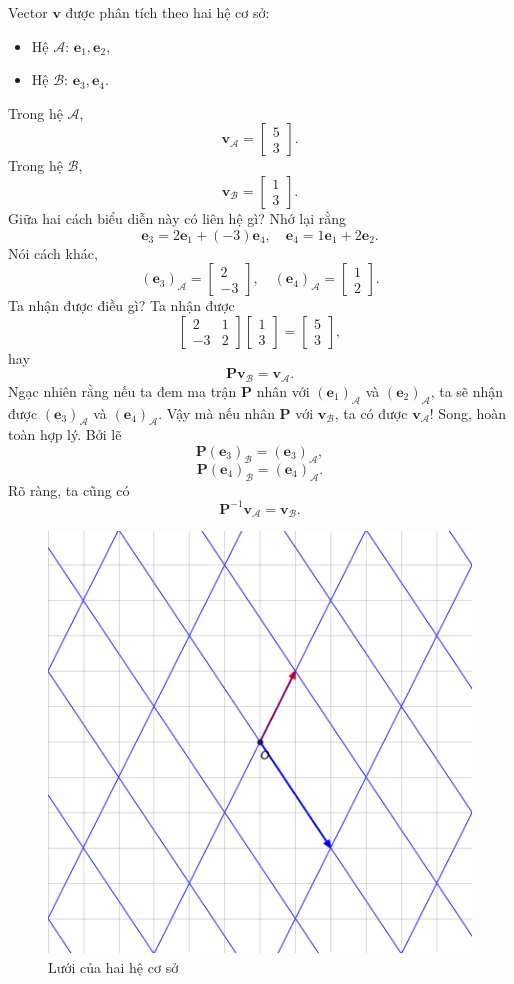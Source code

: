 Vector \(\mathbf{v}\) được phân tích theo hai hệ cơ sở:
\begin{itemize}
    \item Hệ \(\mathcal{A}\): \(\mathbf{e}_1 ,\mathbf{e}_2\),
    \item Hệ \(\mathcal{B}\): \(\mathbf{e}_3 ,\mathbf{e}_4\).
\end{itemize}
Trong hệ \(\mathcal{A}\), \[\mathbf{v}_{\mathcal{A}}=\begin{bmatrix}
    5\\3
\end{bmatrix}.\] Trong hệ \(\mathcal{B}\), \[\mathbf{v}_{\mathcal{B}}=\begin{bmatrix}
    1\\3
\end{bmatrix}.\] Giữa hai cách biểu diễn này có liên hệ gì? Nhớ lại rằng
\[\mathbf{e}_3 =2\mathbf{e}_1 +(-3)\mathbf{e}_4 ,\quad \mathbf{e}_4 =1\mathbf{e}_1 +2\mathbf{e}_2 .\]
Nói cách khác, \[(\mathbf{e}_3)_{\mathcal{A}}=\begin{bmatrix}
    2\\-3
\end{bmatrix},\quad (\mathbf{e}_{4})_{\mathcal{A}}=\begin{bmatrix}
    1\\2
\end{bmatrix}.\] Ta nhận được điều gì? Ta nhận được
\[\begin{bmatrix}
    2&1\\-3&2
\end{bmatrix}\begin{bmatrix}
    1\\3
\end{bmatrix}=\begin{bmatrix}
    5\\3
\end{bmatrix},\] hay
\[\mathbf{P}\mathbf{v}_{\mathcal{B}}=\mathbf{v}_{\mathcal{A}}.\] Ngạc nhiên rằng nếu ta đem ma trận \(\mathbf{P}\) nhân với 
\((\mathbf{e}_1)_{\mathcal{A}}\) và \((\mathbf{e}_2)_{\mathcal{A}}\), ta sẽ nhận được \((\mathbf{e}_3)_{\mathcal{A}}\) và \((\mathbf{e}_4)_{\mathcal{A}}\). Vậy mà nếu nhân \(\mathbf{P}\) với \(\mathbf{v}_{\mathcal{B}}\), ta có được \(\mathbf{v}_{\mathcal{A}}\)!
Song, hoàn toàn hợp lý. Bởi lẽ \[\mathbf{P}(\mathbf{e}_3)_{\mathcal{B}}=(\mathbf{e}_3)_{\mathcal{A}},\]
\[\mathbf{P}(\mathbf{e}_4)_{\mathcal{B}}=(\mathbf{e}_4)_{\mathcal{A}}.\] 
Rõ ràng, ta cũng có \[\mathbf{P}^{-1}\mathbf{v}_{\mathcal{A}}=\mathbf{v}_{\mathcal{B}}.\]
\begin{figure}[H]
    \centering
    \includegraphics[width=0.4\linewidth]{Tuan2/Figures/LT10.png}
    \caption{Lưới của hai hệ cơ sở}
\end{figure}
